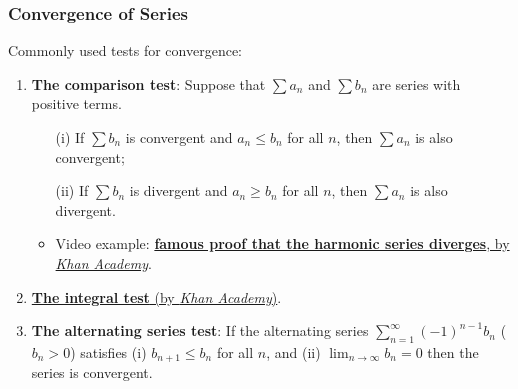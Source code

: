 \documentclass{beamer}
\begin{document}
\begin{frame}
\frametitle{Convergence of Series}
Commonly used tests for convergence:
\begin{enumerate}
\item \textbf{The comparison test}: Suppose that $\sum a_n$ and $\sum b_n$ are series with positive terms. 
\begin{itemize}
\item[(i)] If $\sum b_n$ is convergent and $a_n \leq b_n$ for all $n$, then $\sum a_n$ is also convergent;
\item[(ii)] If $\sum b_n$ is divergent and $a_n \geq b_n$ for all $n$, then $\sum a_n$ is also divergent.
\item Video example: \href{https://youtu.be/4yyLfrsSXQQ}{\textbf{famous proof that the harmonic series diverges}, by \textit{Khan Academy}}.
\end{itemize}
\item \href{https://youtu.be/xRyXz_UZ14Q}{\textbf{The integral test} (by \textit{Khan Academy})}.
\item \textbf{The alternating series test}: If the alternating series $\sum_{n=1}^{\infty} (-1)^{n-1} b_n$ ($b_n > 0$) satisfies (i) $b_{n+1} \leq b_n$ for all $n$, and (ii) $\lim_{n \rightarrow \infty} b_n = 0$ then the series is convergent.
\end{enumerate}
\end{frame}
\end{document}
